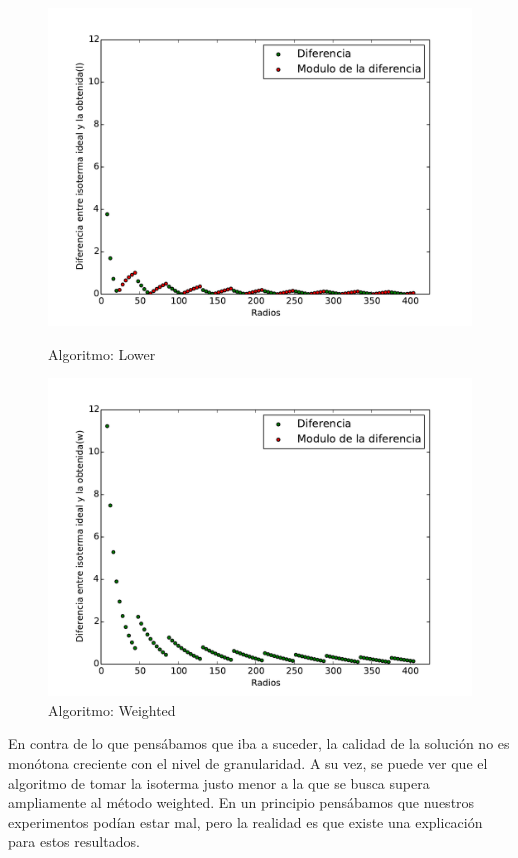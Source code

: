 \begin{figure}[h]
  \centering
  \begin{minipage}[b]{0.49\textwidth}
    \includegraphics[width=\textwidth]{graficos/mVariable_l.pdf}
    \caption{Algoritmo: Lower}
  \end{minipage}
  \hfill
  \begin{minipage}[b]{0.49\textwidth}
    \includegraphics[width=\textwidth]{graficos/mVariable_w.pdf}
    \caption{Algoritmo: Weighted}
  \end{minipage}
\end{figure}

En contra de lo que pensábamos que iba a suceder, la calidad de la solución no es monótona creciente con el nivel de granularidad. A su vez, se puede ver que el algoritmo de tomar la isoterma justo menor a la que se busca supera ampliamente al método weighted. En un principio pensábamos que nuestros experimentos podían estar mal, pero la realidad es que existe una explicación para estos resultados.

